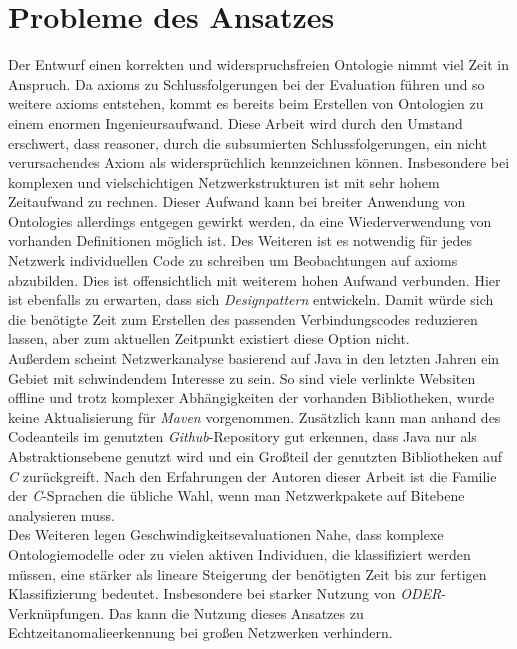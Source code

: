 \section{Probleme des Ansatzes}
Der Entwurf einen korrekten und widerspruchsfreien Ontologie nimmt viel Zeit in Anspruch. Da \Glspl{axiom} zu Schlussfolgerungen bei der Evaluation führen und so weitere \Glspl{axiom} entstehen, kommt es bereits beim Erstellen von Ontologien zu einem enormen Ingenieursaufwand. Diese Arbeit wird durch den Umstand erschwert, dass \Gls{reasoner}, durch die subsumierten Schlussfolgerungen, ein nicht verursachendes Axiom als widersprüchlich kennzeichnen können. Insbesondere bei komplexen und vielschichtigen Netzwerkstrukturen ist mit sehr hohem Zeitaufwand zu rechnen. Dieser Aufwand kann bei breiter Anwendung von \Glspl{Ontologie} allerdings entgegen gewirkt werden, da eine Wiederverwendung von vorhanden Definitionen möglich ist\cite{borst1999construction}. Des Weiteren ist es notwendig für jedes Netzwerk individuellen Code zu schreiben um Beobachtungen auf \Glspl{axiom} abzubilden. Dies ist offensichtlich mit weiterem hohen Aufwand verbunden. Hier ist ebenfalls zu erwarten, dass sich \textit{Designpattern}\cite{proulx2000programming} entwickeln. Damit würde sich die benötigte Zeit zum Erstellen des passenden Verbindungscodes reduzieren lassen, aber zum aktuellen Zeitpunkt existiert diese Option nicht.\\
Außerdem scheint Netzwerkanalyse basierend auf Java in den letzten Jahren ein Gebiet mit schwindendem Interesse zu sein. So sind viele verlinkte Websiten offline und trotz komplexer Abhängigkeiten der vorhanden Bibliotheken, wurde keine Aktualisierung für \textit{Maven}\cite{maven} vorgenommen. Zusätzlich kann man anhand des Codeanteils im genutzten \textit{Github}-Repository\cite{gitcode} gut erkennen, dass Java nur als Abstraktionsebene genutzt wird und ein Großteil der genutzten Bibliotheken auf \textit{C} zurückgreift. Nach den Erfahrungen der Autoren dieser Arbeit ist die Familie der \textit{C}-Sprachen die übliche Wahl, wenn man Netzwerkpakete auf Bitebene analysieren muss.\\
Des Weiteren legen Geschwindigkeitsevaluationen Nahe, dass komplexe Ontologiemodelle oder zu vielen aktiven Individuen, die klassifiziert werden müssen, eine stärker als lineare Steigerung der benötigten Zeit bis zur fertigen Klassifizierung bedeutet. Insbesondere bei starker Nutzung von \textit{ODER}-Verknüpfungen\cite[p.~5]{roy2010exploitation}. Das kann die Nutzung dieses Ansatzes zu Echtzeitanomalieerkennung bei großen Netzwerken verhindern.\\

